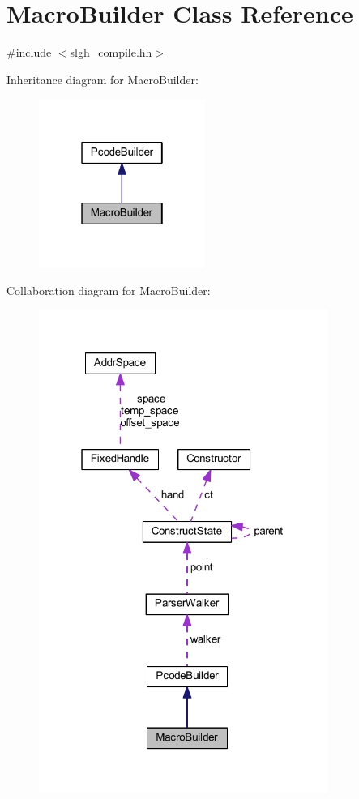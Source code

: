 \hypertarget{class_macro_builder}{}\section{Macro\+Builder Class Reference}
\label{class_macro_builder}


{\ttfamily \#include $<$slgh\+\_\+compile.\+hh$>$}



Inheritance diagram for Macro\+Builder\+:
\nopagebreak
\begin{figure}[H]
\begin{center}
\leavevmode
\includegraphics[width=154pt]{class_macro_builder__inherit__graph}
\end{center}
\end{figure}


Collaboration diagram for Macro\+Builder\+:
\nopagebreak
\begin{figure}[H]
\begin{center}
\leavevmode
\includegraphics[width=268pt]{class_macro_builder__coll__graph}
\end{center}
\end{figure}
